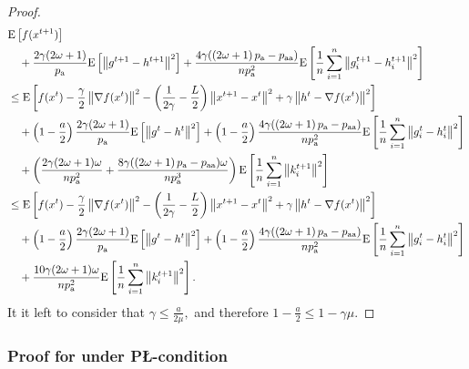 \documentclass{article}
\newcommand{\algorithmname}{DARIA}
\newcommand*{\probavailable}{\ensuremath{p_{\textnormal{a}}}}
\newcommand*{\probpairaa}{\ensuremath{p_{\textnormal{aa}}}}
\begin{document}
\begin{proof}
  \begin{align*}
    &\Exp{f(x^{t + 1})} \\
    &\quad  + \frac{2\gamma (2\omega + 1)}{\probavailable} \Exp{\norm{g^{t+1} - h^{t+1}}^2} + \frac{4 \gamma (\left(2 \omega + 1\right)\probavailable - \probpairaa)}{n \probavailable^2} \Exp{\frac{1}{n}\sum_{i=1}^n\norm{g^{t+1}_i - h^{t+1}_i}^2}\\
    &\leq \Exp{f(x^t) - \frac{\gamma}{2}\norm{\nabla f(x^t)}^2 - \left(\frac{1}{2\gamma} - \frac{L}{2}\right)
    \norm{x^{t+1} - x^t}^2 + \gamma \norm{h^{t} - \nabla f(x^t)}^2}\nonumber\\
    &\quad + \left(1 - \frac{a}{2}\right)\frac{2\gamma(2\omega + 1)}{\probavailable}\Exp{\norm{g^{t} - h^t}^2} + \left(1 - \frac{a}{2}\right)\frac{4 \gamma (\left(2 \omega + 1\right)\probavailable - \probpairaa)}{n \probavailable^2}\Exp{\frac{1}{n} \sum_{i=1}^n\norm{g^t_i - h^{t}_i}^2}\nonumber\\
    &\quad + \left(\frac{2 \gamma (2 \omega + 1)\omega}{n \probavailable^2} + \frac{8 \gamma (\left(2 \omega + 1\right)\probavailable - \probpairaa) \omega}{n \probavailable^3}\right)\Exp{\frac{1}{n} \sum_{i=1}^n\norm{k^{t+1}_i}^2} \\
    &\leq \Exp{f(x^t) - \frac{\gamma}{2}\norm{\nabla f(x^t)}^2 - \left(\frac{1}{2\gamma} - \frac{L}{2}\right)
    \norm{x^{t+1} - x^t}^2 + \gamma \norm{h^{t} - \nabla f(x^t)}^2}\nonumber\\
    &\quad + \left(1 - \frac{a}{2}\right)\frac{2\gamma(2\omega + 1)}{\probavailable}\Exp{\norm{g^{t} - h^t}^2} + \left(1 - \frac{a}{2}\right)\frac{4 \gamma (\left(2 \omega + 1\right)\probavailable - \probpairaa)}{n \probavailable^2}\Exp{\frac{1}{n} \sum_{i=1}^n\norm{g^t_i - h^{t}_i}^2}\nonumber\\
    &\quad + \frac{10 \gamma (2 \omega + 1)\omega}{n \probavailable^2}\Exp{\frac{1}{n} \sum_{i=1}^n\norm{k^{t+1}_i}^2}.
  \end{align*}
  It it left to consider that $\gamma \leq \frac{a}{2\mu},$ and therefore $1 - \frac{a}{2} \leq 1 - \gamma \mu.$
\end{proof}

\subsubsection{Proof for \algname{\algorithmname} under P\L-condition}

\CONVERGENCEPL*
\end{document}
